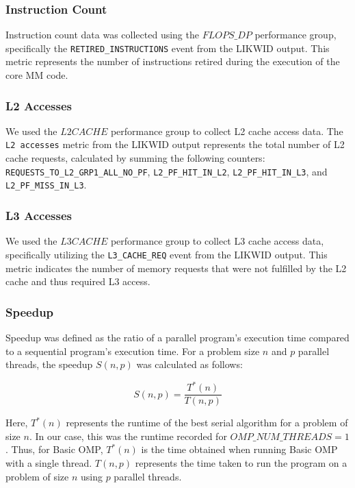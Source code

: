 \subsubsection{Instruction Count}
\label{subsubsec:instruction-count}
Instruction count data was collected using the \(FLOPS\_DP\) performance group, specifically the \texttt{RETIRED\_INSTRUCTIONS} event from the LIKWID output. This metric represents the number of instructions retired during the execution of the core MM code.

\subsubsection{L2 Accesses}
\label{subsubsec:l2-accesses}
We used the \(L2CACHE\) performance group to collect L2 cache access data. The \texttt{L2 accesses} metric from the LIKWID output represents the total number of L2 cache requests, calculated by summing the following counters: \texttt{REQUESTS\_TO\_L2\_GRP1\_ALL\_NO\_PF}, \texttt{L2\_PF\_HIT\_IN\_L2}, \texttt{L2\_PF\_HIT\_IN\_L3}, and \texttt{L2\_PF\_MISS\_IN\_L3}.

\subsubsection{L3 Accesses}
\label{subsubsec:l3-accesses}
We used the \(L3CACHE\) performance group to collect L3 cache access data, specifically utilizing the \texttt{L3\_CACHE\_REQ} event from the LIKWID output. This metric indicates the number of memory requests that were not fulfilled by the L2 cache and thus required L3 access.

\subsubsection{Speedup}
\label{subsubsec:speedup}
Speedup was defined as the ratio of a parallel program's execution time compared to a sequential program's execution time. For a problem size \(n\) and \(p\) parallel threads, the speedup \(S(n, p)\) was calculated as follows:

\begin{displaymath}
    S(n, p) = \frac{T^*(n)}{T(n, p)}
\end{displaymath}

Here, \(T^*(n)\) represents the runtime of the best serial algorithm for a problem of size \(n\). In our case, this was the runtime recorded for \(OMP\_NUM\_THREADS = 1\). Thus, for Basic OMP, \(T^*(n)\) is the time obtained when running Basic OMP with a single thread. \(T(n, p)\) represents the time taken to run the program on a problem of size \(n\) using \(p\) parallel threads.